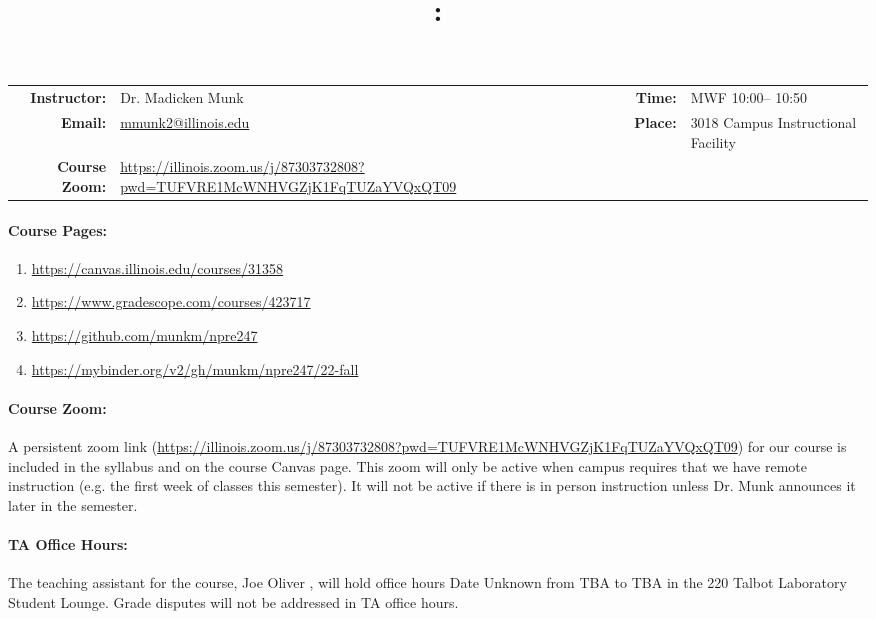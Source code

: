 \documentclass[11pt, a4paper]{article}
\title{\CourseNumber: \CourseTitle\\}
\author{\CourseUniversity}
\date{\CourseSemester \CourseYear}
\makeatletter
\newcommand{\CourseInstructor}{Dr. Madicken Munk\xspace}%
\newcommand{\CourseDays}{MWF\xspace}%
\newcommand{\CourseStart}{10:00\xspace}%
\newcommand{\CourseEnd}{10:50\xspace}%
\newcommand{\CourseInstructorEmail}{mmunk2@illinois.edu}
\newcommand{\CourseRoom}{3018\xspace}%
\newcommand{\CourseBuilding}{Campus Instructional Facility\xspace}%
\newcommand{\CourseZoom}{https://illinois.zoom.us/j/87303732808?pwd=TUFVRE1McWNHVGZjK1FqTUZaYVQxQT09}%
\newcommand{\TeachingAssistant}{Joe Oliver \xspace}%
\newcommand{\TAOfficeHourDays}{Date Unknown \xspace}%
\newcommand{\TAOfficeHourStart}{TBA\xspace}%
\newcommand{\TAOfficeHourEnd}{TBA\xspace}%
\newcommand{\TAOfficeHourPlace}{the 220 Talbot Laboratory Student Lounge\xspace}
\makeatother
\begin{document}
\maketitle
\renewcommand{\arraystretch}{1.5}
\begin{center}
\begin{table}[h]
\begin{tabularx}{\textwidth}{rXrX}
\hline
\textbf{Instructor:} & \CourseInstructor & \textbf{Time:} & \CourseDays \CourseStart -- \CourseEnd \\
\textbf{Email:} &  \href{mailto:\CourseInstructorEmail}{\CourseInstructorEmail} & \textbf{Place:} & \CourseRoom \CourseBuilding\\
\textbf{Course Zoom:} & \url{\CourseZoom} & & \\
\hline
\end{tabularx}
\end{table}
\end{center}

\paragraph{Course Pages:}
\begin{enumerate}
        \item \url{https://canvas.illinois.edu/courses/31358}
        \item \url{https://www.gradescope.com/courses/423717}
        \item \url{https://github.com/munkm/npre247}
        \item \url{https://mybinder.org/v2/gh/munkm/npre247/22-fall}
\end{enumerate}

\paragraph{Course Zoom:} A persistent zoom link (\url{\CourseZoom})
for our course is included in
the syllabus and on the course Canvas page.
This zoom will only be active when campus
requires that we have remote instruction (e.g. the first week of classes this
semester). It will not be active if there is in person instruction unless Dr.
Munk announces it later in the semester.

\paragraph{TA Office Hours:} The teaching assistant for the course,
\TeachingAssistant, will hold office hours \TAOfficeHourDays from
\TAOfficeHourStart to \TAOfficeHourEnd in \TAOfficeHourPlace.
Grade disputes will not be addressed in TA office hours.
\end{document}
